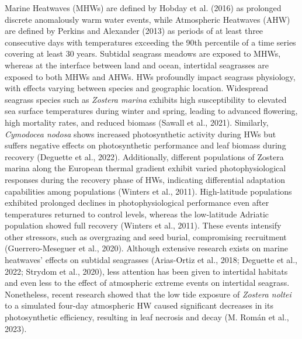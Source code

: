 \documentclass[
  letterpaper,
  11pt,
  english,
  singlespacing,
  headsepline]{MastersDoctoralThesis}
\begin{document}
\begin{spacing}{1.5}
Marine Heatwaves (MHWs) are defined by Hobday et al. (2016) as prolonged
discrete anomalously warm water events, while Atmospheric Heatwaves
(AHW) are defined by Perkins and Alexander (2013) as periods of at least
three consecutive days with temperatures exceeding the 90th percentile
of a time series covering at least 30 years. Subtidal seagrass meadows
are exposed to MHWs, whereas at the interface between land and ocean,
intertidal seagrasses are exposed to both MHWs and AHWs. HWs profoundly
impact seagrass physiology, with effects varying between species and
geographic location. Widespread seagrass species such as \emph{Zostera
marina} exhibits high susceptibility to elevated sea surface
temperatures during winter and spring, leading to advanced flowering,
high mortality rates, and reduced biomass (Sawall et al., 2021).
Similarly, \emph{Cymodocea nodosa} shows increased photosynthetic
activity during HWs but suffers negative effects on photosynthetic
performance and leaf biomass during recovery (Deguette et al., 2022).
Additionally, different populations of Zostera marina along the European
thermal gradient exhibit varied photophysiological responses during the
recovery phase of HWs, indicating differential adaptation capabilities
among populations (Winters et al., 2011). High-latitude populations
exhibited prolonged declines in photophysiological performance even
after temperatures returned to control levels, whereas the low-latitude
Adriatic population showed full recovery (Winters et al., 2011). These
events intensify other stressors, such as overgrazing and seed burial,
compromising recruitment (Guerrero-Meseguer et al., 2020). Although
extensive research exists on marine heatwaves' effects on subtidal
seagrasses (Arias-Ortiz et al., 2018; Deguette et al., 2022; Strydom et
al., 2020), less attention has been given to intertidal habitats and
even less to the effect of atmospheric extreme events on intertidal
seagrass. Nonetheless, recent research showed that the low tide exposure
of \emph{Zostera noltei} to a simulated four-day atmospheric HW caused
significant decreases in its photosynthetic efficiency, resulting in
leaf necrosis and decay (M. Román et al., 2023).


\end{spacing}
\end{document}

